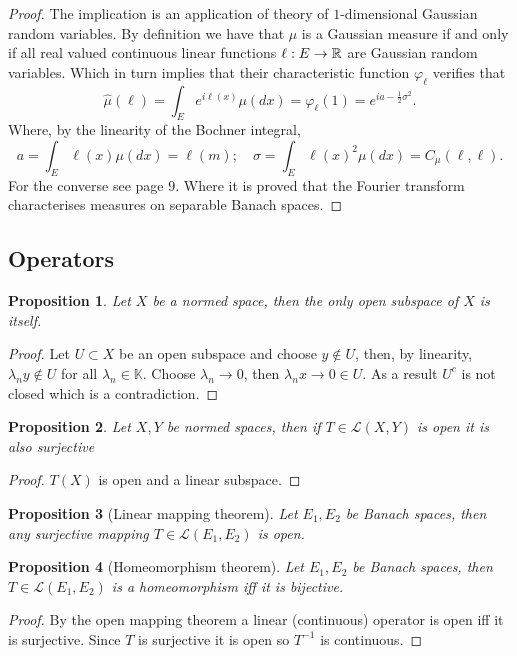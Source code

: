 \documentclass[12pt]{article}
\newtheorem{proposition}{Proposition}
\begin{document}
\begin{proof}
    The implication is an application of theory of $1$-dimensional Gaussian random variables. By definition we have that $\mu $  is a Gaussian measure if and only if all real valued continuous linear functions $\ell:E\to {\mathbb R}$ are Gaussian random variables. Which in turn implies that their characteristic function $\varphi_\ell $ verifies that
    \begin{equation*}
        \hat{\mu }(\ell )=\int_{E} e^{i\ell (x)} \mu (dx)=\varphi_{\ell}(1)=e^{ia -\frac{1}{2}\sigma^2} .
    \end{equation*}
    Where, by the linearity of the Bochner integral,
    \begin{equation*}
        a       =\int_{E}\ell(x)\mu(dx)=\ell(m);\quad
        \sigma  =\int_{E}\ell(x)^2\mu(dx)=C_\mu (\ell ,\ell).
    \end{equation*}
    For the converse see \cite{hairer2009introduction} page $9$. Where it is proved that the Fourier transform characterises measures on separable Banach spaces.
\end{proof}




\subsection{Operators}
\begin{proposition}
    Let $X$ be a normed space, then the only open subspace of $X$ is itself.
\end{proposition}
\begin{proof}
    Let $U\subset X$ be an open subspace and choose $y\notin U$, then, by linearity, $\lambda_n y\notin U$ for all $\lambda_n\in\mathbb{K}$. Choose $\lambda_n\to 0$, then $\lambda_n x\to 0 \in U$. As a result $U^c$ is not closed which is a contradiction.
\end{proof}
\begin{proposition}
    Let $X, Y$ be normed spaces, then if $T\in\mathcal{L}(X,Y)$ is open it is also surjective
\end{proposition}
\begin{proof}
    $T(X)$ is open and a linear subspace.
\end{proof}
\begin{proposition}[Linear mapping theorem]
    Let $E_1,E_2$ be Banach spaces, then any surjective mapping $T\in\mathcal{L}(E_1,E_2)$ is open.
\end{proposition}
\begin{proposition}[Homeomorphism theorem]
    Let $E_1,E_2$ be Banach spaces, then $T\in\mathcal{L}(E_1,E_2)$ is a homeomorphism iff it is bijective.
\end{proposition}
\begin{proof}
    By the open mapping theorem a linear (continuous) operator is open iff it is surjective. Since $T$ is surjective it is open so $T^{-1}$ is continuous.
\end{proof}
\end{document}
